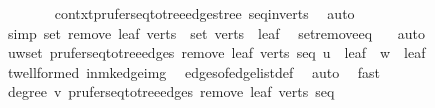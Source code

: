 \begin{isabellebody}
\ \ \ \ \ \ \isamarkupfalse%
\ contxt{\isacharprime}{\kern0pt}{\isachardot}{\kern0pt}prufer{\isacharunderscore}{\kern0pt}seq{\isacharunderscore}{\kern0pt}to{\isacharunderscore}{\kern0pt}tree{\isacharunderscore}{\kern0pt}edges{\isacharunderscore}{\kern0pt}tree\ seq{\isacharunderscore}{\kern0pt}in{\isacharunderscore}{\kern0pt}verts{\isacharprime}{\kern0pt}\ \isamarkupfalse%
\ auto\isanewline
\ \ \ \ \isamarkupfalse%
\ {\isacharbrackleft}{\kern0pt}simp{\isacharbrackright}{\kern0pt}{\isacharcolon}{\kern0pt}\ {\isachardoublequoteopen}set\ {\isacharparenleft}{\kern0pt}remove{}\ leaf\ verts{\isacharparenright}{\kern0pt}\ {\isacharequal}{\kern0pt}\ set\ verts\ {\isacharminus}{\kern0pt}\ {\isacharbraceleft}{\kern0pt}leaf{\isacharbraceright}{\kern0pt}{\isachardoublequoteclose}\ \isamarkupfalse%
\ set{\isacharunderscore}{\kern0pt}remove{}{\isacharunderscore}{\kern0pt}eq\ {}\ \isamarkupfalse%
\ auto\isanewline
\ \ \ \ \isamarkupfalse%
\ \isamarkupfalse%
\ {\isachardoublequoteopen}{\isasymforall}{\isacharparenleft}{\kern0pt}u{\isacharcomma}{\kern0pt}w{\isacharparenright}{\kern0pt}{\isasymin}set\ {\isacharparenleft}{\kern0pt}prufer{\isacharunderscore}{\kern0pt}seq{\isacharunderscore}{\kern0pt}to{\isacharunderscore}{\kern0pt}tree{\isacharunderscore}{\kern0pt}edges\ {\isacharparenleft}{\kern0pt}remove{}\ leaf\ verts{\isacharparenright}{\kern0pt}\ seq{\isacharparenright}{\kern0pt}{\isachardot}{\kern0pt}\ u\ {\isasymnoteq}\ leaf\ {\isasymand}\ w\ {\isasymnoteq}\ leaf{\isachardoublequoteclose}\isanewline
\ \ \ \ \ \ \isamarkupfalse%
\ t{\isachardot}{\kern0pt}wellformed\ in{\isacharunderscore}{\kern0pt}mk{\isacharunderscore}{\kern0pt}edge{\isacharunderscore}{\kern0pt}img\ \isamarkupfalse%
\ edges{\isacharunderscore}{\kern0pt}of{\isacharunderscore}{\kern0pt}edge{\isacharunderscore}{\kern0pt}list{\isacharunderscore}{\kern0pt}def\ \isamarkupfalse%
\ auto\ \isamarkupfalse%
\ fast{\isacharplus}{\kern0pt}\isanewline
\ \ \ \ \isamarkupfalse%
\ \isamarkupfalse%
\ {\isachardoublequoteopen}degree\ v\ {\isacharparenleft}{\kern0pt}prufer{\isacharunderscore}{\kern0pt}seq{\isacharunderscore}{\kern0pt}to{\isacharunderscore}{\kern0pt}tree{\isacharunderscore}{\kern0pt}edges\ {\isacharparenleft}{\kern0pt}remove{}\ leaf\ verts{\isacharparenright}{\kern0pt}\ seq{\isacharparenright}{\kern0pt}\ {\isacharequal}{\kern0pt}\ {}{\isachardoublequoteclose}\isanewline

\end{isabellebody}
